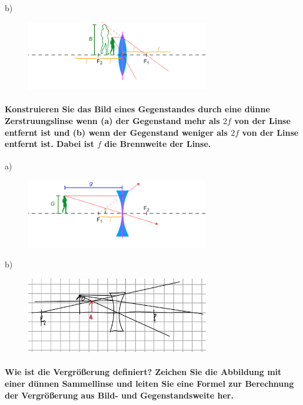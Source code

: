 \documentclass[a4paper, 11pt, parskip=half]{scrartcl}
\begin{document}
b)
\begin{figure}[H]
    \centering
    \includegraphics[width=8cm]{image/17/geo15b}
\end{figure}







\paragraph{Konstruieren Sie das Bild eines Gegenstandes durch eine dünne Zerstruungslinse wenn (a)
der Gegenstand mehr als $2f$ von der Linse entfernt ist und (b) wenn der Gegenstand weniger
als $2f$ von der Linse entfernt ist. Dabei ist $f$ die Brennweite der Linse.}


a)
\begin{figure}[H]
    \centering
    \includegraphics[width=8cm]{image/17/geo16a}
\end{figure}



b)
\begin{figure}[H]
    \centering
    \includegraphics[width=8cm]{image/17/geo16b}
\end{figure}








\paragraph{Wie ist die Vergrößerung definiert? Zeichen Sie die Abbildung mit einer dünnen
Sammellinse und leiten Sie eine Formel zur Berechnung der Vergrößerung aus Bild- und
Gegenstandsweite her.}
\end{document}
